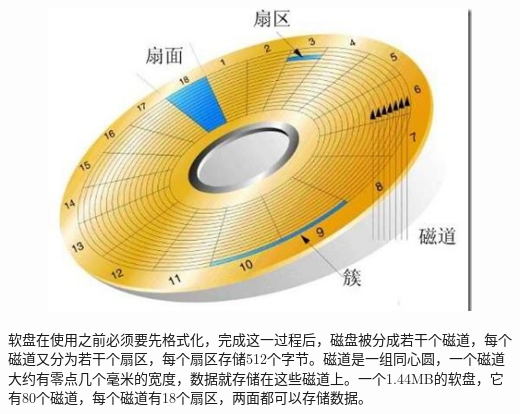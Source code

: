 \begin{multicols}{3}
\begin{figure}[H]
    \centering
    \includegraphics[width=0.7\linewidth,clip=true,trim=0 0 10 0]{IMG/202001/0_1316582210EB43.jpg}
\end{figure}

软盘在使用之前必须要先格式化，完成这一过程后，磁盘被分成若干个磁道，每个磁道又分为若干个扇区，每个扇区存储512个字节。磁道是一组同心圆，一个磁道大约有零点几个毫米的宽度，数据就存储在这些磁道上。一个1.44MB的软盘，它有80个磁道，每个磁道有18个扇区，两面都可以存储数据。\EOA
\end{multicols}

